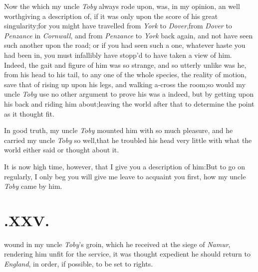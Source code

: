 \documentclass{article}
\begin{document}
Now the  which my\break
uncle \textit{Toby} always rode upon, was, in my\break
opinion, an  well worth\break giving
a description of, if it was only upon the score of his great
singularity;\break for you might have travelled from \textit{York} to
\textit{Dover},\tsk from \textit{Dover} to \textit{Penzance} in
\textit{Cornwall}, and from \textit{Penzance} to \textit{York} back
again, and not have seen such another upon the road; or if you had seen
such a one, whatever haste you had been in, you must infallibly have
stopp’d to have taken a view of him. Indeed, the gait and figure of him
was so strange, and so utterly unlike was he, from his head to his tail,
to any one of the whole species, 
the reality of motion, save that of rising
up upon his legs, and walking a-cross the
room;\tsk so would my uncle \textit{Toby} use 
no other argument to prove his 
 was a  indeed, 
but by getting upon his back and riding
him about;\tsk leaving the world after that 
to determine the point as it thought fit.

In good truth, my uncle \textit{Toby} mounted him with so much
pleasure, and he carried my uncle \textit{Toby} so
well,\tsh that he troubled his head very little with what
the world either said or thought about it.

It is now high time, however, that I give you a description of
him:\tsk But to go on regularly, I only beg you will give me
leave to acquaint you first, how my uncle \textit{Toby} came by
him.

\null
\section{.\enspace XXV.}

 wound in my uncle \textit{Toby}’s\break
groin, which he received at the\break
siege of \textit{Namur}, rendering him unfit for 
the service, it was thought expedient he
should return to \textit{England}, in order, if\break
possible, to be set to rights.
\end{document}
